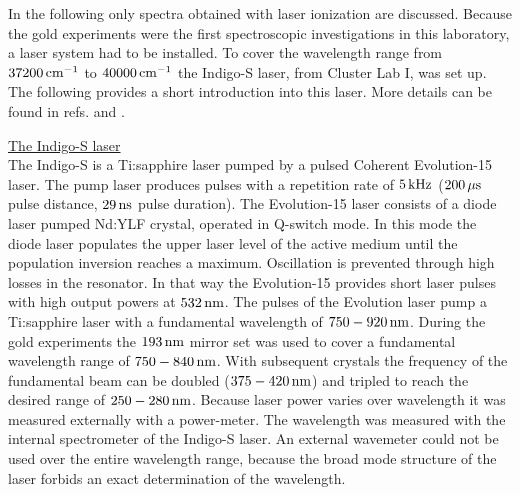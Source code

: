 \documentclass[parskip,12pt,headsepline,a4paper] {scrbook}
\begin{document}
In the following only spectra obtained with laser ionization are discussed. Because the gold experiments were the first spectroscopic investigations in this laboratory, a laser system had to be installed. To cover the wavelength range from $\unit[37200]{cm^{-1}}$ to $\unit[40000]{cm^{-1}}$ the Indigo-S laser, from Cluster Lab I, was set up. The following provides a short introduction into this laser. More details can be found in refs. \cite{lackner} and \cite{pifrader}.

\underline{The Indigo-S laser} \\
The Indigo-S is a Ti:sapphire laser pumped by a pulsed Coherent Evolution-15 laser. The pump laser produces pulses with a repetition rate of $\unit[5]{kHz}$ ($\unit[200]{\mu s}$ pulse distance, $\unit[29]{ns}$ pulse duration). The Evolution-15 laser consists of a diode laser pumped Nd:YLF crystal, operated in Q-switch mode. In this mode the diode laser populates the upper laser level of the active medium until the population inversion reaches a maximum. Oscillation is prevented through high losses in the resonator. In that way the Evolution-15 provides short laser pulses with high output powers at $\unit[532]{nm}$. The pulses of the Evolution laser pump a Ti:sapphire laser with a fundamental wavelength of $\unit[750-920]{nm}$. During the gold experiments the $\unit[193]{nm}$ mirror set was used to cover a fundamental wavelength range of $\unit[750-840]{nm}$. With subsequent crystals the frequency of the fundamental beam can be doubled ($\unit[375-420]{nm}$) and tripled to reach the desired range of $\unit[250-280]{nm}$. Because laser power varies over wavelength it was measured externally with a power-meter. The wavelength was measured with the internal spectrometer of the Indigo-S laser. An external wavemeter could not be used over the entire wavelength range, because the broad mode structure of the laser forbids an exact determination of the wavelength.

\newpage
\end{document}
